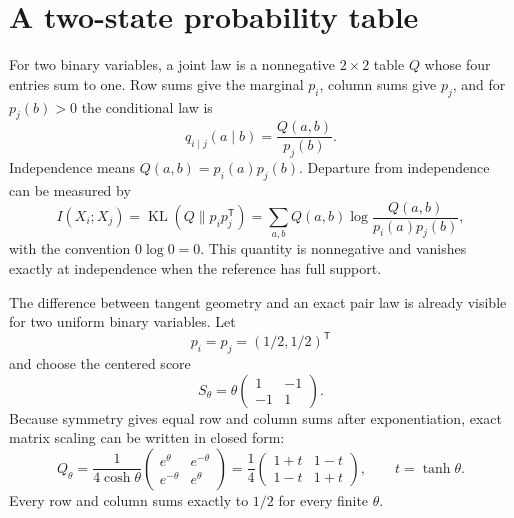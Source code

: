 \section*{A two-state probability table}

For two binary variables, a joint law is a nonnegative $2\times2$ table $Q$ whose four entries sum
to one.  Row sums give the marginal $p_i$, column sums give $p_j$, and for $p_j(b)>0$ the conditional
law is
\begin{equation}
q_{i\mid j}(a\mid b)=\frac{Q(a,b)}{p_j(b)}.
\end{equation}
Independence means $Q(a,b)=p_i(a)p_j(b)$.  Departure from independence can be measured by
\begin{equation}
I(X_i;X_j)
=\operatorname{KL}(Q\|p_ip_j^{\mathsf T})
=\sum_{a,b}Q(a,b)\log\frac{Q(a,b)}{p_i(a)p_j(b)},
\label{eq:book-binary-mi-definition}
\end{equation}
with the convention $0\log0=0$.  This quantity is nonnegative and vanishes exactly at
independence when the reference has full support.

The difference between tangent geometry and an exact pair law is already visible for two uniform
binary variables.  Let
\begin{equation}
p_i=p_j=(1/2,1/2)^{\mathsf T}
\end{equation}
and choose the centered score
\begin{equation}
S_\theta
=\theta
\begin{pmatrix}
1&-1\\
-1&1
\end{pmatrix}.
\label{eq:book-binary-score}
\end{equation}
Because symmetry gives equal row and column sums after exponentiation, exact matrix scaling can be
written in closed form:
\begin{equation}
Q_\theta
=\frac{1}{4\cosh\theta}
\begin{pmatrix}
e^\theta&e^{-\theta}\\
e^{-\theta}&e^\theta
\end{pmatrix}
=\frac14
\begin{pmatrix}
1+t&1-t\\
1-t&1+t
\end{pmatrix},
\qquad t=\tanh\theta.
\label{eq:book-binary-scaled-law}
\end{equation}
Every row and column sums exactly to $1/2$ for every finite $\theta$.

